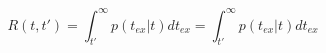 \begin{equation}
R(t,t') = \int_{t'}^\infty p(t_{ex}|t) dt_{ex} = \int_{t'}^\infty p(t_{ex}|t) dt_{ex}
\end{equation}